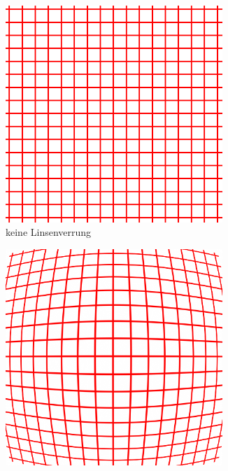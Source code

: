 \begin{figure}[!htb]
	\centering
	\begin{subfigure}{.33\textwidth}
		\centering
		\includegraphics[width=0.9\textwidth]{images/undistorted.png}
		\caption{keine Linsenverrung}
		\label{fig:undist}
	\end{subfigure}%
	\begin{subfigure}{.33\textwidth}
		\centering
		\includegraphics[width=0.9\textwidth]{images/barrelDistortion.png}

\end{subfigure}
\end{figure}
